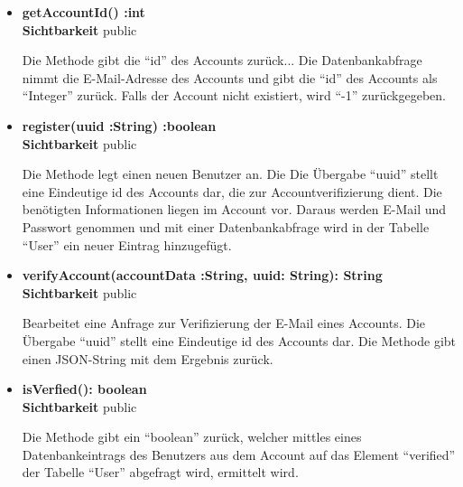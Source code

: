 \begin{itemize}
\item \textbf{getAccountId() :int}\hfill\\
\textbf{Sichtbarkeit} public

Die Methode gibt die ``id'' des Accounts zurück... Die Datenbankabfrage nimmt die E-Mail-Adresse des Accounts und gibt die ``id'' des Accounts als ``Integer'' zurück. Falls der Account nicht existiert, wird ``-1'' zurückgegeben.

\item \textbf{register(uuid :String) :boolean}\hfill\\
\textbf{Sichtbarkeit} public

Die Methode legt einen neuen Benutzer an. Die Die Übergabe ``uuid'' stellt eine Eindeutige id des Accounts dar, die zur Accountverifizierung dient. Die benötigten Informationen liegen im Account vor. Daraus werden E-Mail und Passwort genommen und mit einer Datenbankabfrage wird in der Tabelle ``User'' ein neuer Eintrag hinzugefügt. 

\item \textbf{verifyAccount(accountData :String, uuid: String): String}\hfill\\
\textbf{Sichtbarkeit} public

Bearbeitet eine Anfrage zur Verifizierung der E-Mail eines Accounts. Die Übergabe ``uuid'' stellt eine Eindeutige id des Accounts dar. Die Methode gibt einen JSON-String mit dem Ergebnis zurück.

\item \textbf{isVerfied(): boolean}\hfill\\
\textbf{Sichtbarkeit} public

Die Methode gibt ein ``boolean'' zurück, welcher mittles eines Datenbankeintrags des Benutzers aus dem Account auf das Element ``verified'' der Tabelle ``User'' abgefragt wird, ermittelt wird.

\end{itemize}